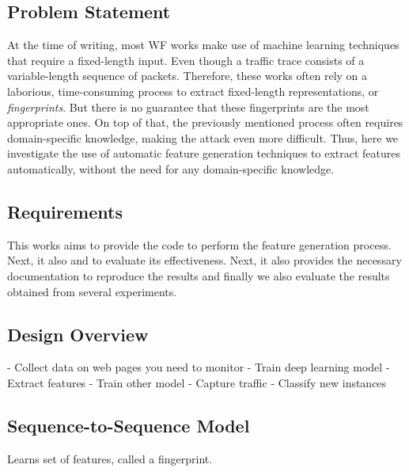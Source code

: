 \subsection{Problem Statement}

At the time of writing, most WF works make use of machine learning techniques that require a fixed-length input.
Even though a traffic trace consists of a variable-length sequence of packets.
Therefore, these works often rely on a laborious, time-consuming process to extract fixed-length representations, or \textit{fingerprints}.
But there is no guarantee that these fingerprints are the most appropriate ones.
On top of that, the previously mentioned process often requires domain-specific knowledge, making the attack even more difficult.
Thus, here we investigate the use of automatic feature generation techniques to extract features automatically, without the need for any domain-specific knowledge.


\subsection{Requirements}
This works aims to provide the code to perform the feature generation process.
Next, it also and to evaluate its effectiveness.
Next, it also provides the necessary documentation to reproduce the results and finally we also evaluate the results obtained from several experiments.

\subsection{Design Overview}

- Collect data on web pages you need to monitor
- Train deep learning model
- Extract features
- Train other model
- Capture traffic
- Classify new instances


\subsection{Sequence-to-Sequence Model}

Learns set of features, called a fingerprint.

